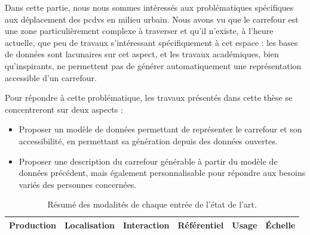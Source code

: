

Dans cette partie, nous nous sommes intéressés aux problématiques spécifiques aux déplacement des \glspl{pcdv} en milieu urbain. Nous avons vu que le carrefour est une zone particulièrement complexe à traverser et qu'il n'existe, à l'heure actuelle, que peu de travaux s'intéressant spécifiquement à cet espace : les bases de données sont lacunaires sur cet aspect, et les travaux académiques, bien qu'inspirants, ne permettent pas de générer automatiquement une représentation accessible d'un carrefour.

Pour répondre à cette problématique, les travaux présentés dans cette thèse se concentreront sur deux aspects :
\begin{itemize}
    \item Proposer un modèle de données permettant de représenter le carrefour et son accessibilité, en permettant sa génération depuis des données ouvertes.
    \item Proposer une description du carrefour générable à partir du modèle de données précédent, mais également personnalisable pour répondre aux besoins variés des personnes concernées.
\end{itemize}


\begin{table}
\begin{center}
\scriptsize
\begin{tabular}{ | l | l | l | l | l | l | }
    Production & Localisation & Interaction & Référentiel & Usage & Échelle \tabularnewline
    \hline
\end{tabular}
\end{center}
\caption{Résumé des modalités de chaque entrée de l'état de l'art.}
\label{tab:ea_resume}
\end{table}